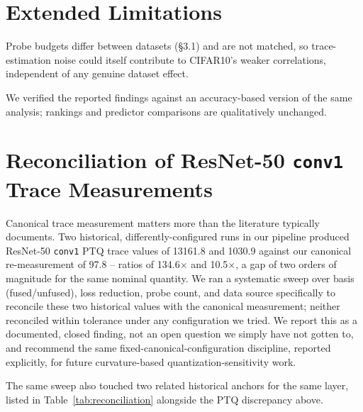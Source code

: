 \documentclass{article}
\begin{document}



\appendix

\section{Extended Limitations}
\label{app:limitations}
Probe budgets differ between datasets (\S3.1) and are not matched, so trace-estimation noise could itself contribute to CIFAR10's weaker correlations, independent of any genuine dataset effect.

We verified the reported findings against an accuracy-based version of the same analysis; rankings and predictor comparisons are qualitatively unchanged.

\section{Reconciliation of ResNet-50 \texttt{conv1} Trace Measurements}
\label{app:reconciliation}
Canonical trace measurement matters more than the literature typically documents. Two historical, differently-configured runs in our pipeline produced ResNet-50 \texttt{conv1} PTQ trace values of 13161.8 and 1030.9 against our canonical re-measurement of 97.8 -- ratios of 134.6$\times$ and 10.5$\times$, a gap of two orders of magnitude for the same nominal quantity. We ran a systematic sweep over basis (fused/unfused), loss reduction, probe count, and data source specifically to reconcile these two historical values with the canonical measurement; neither reconciled within tolerance under any configuration we tried. We report this as a documented, closed finding, not an open question we simply have not gotten to, and recommend the same fixed-canonical-configuration discipline, reported explicitly, for future curvature-based quantization-sensitivity work.

The same sweep also touched two related historical anchors for the same layer, listed in Table~\ref{tab:reconciliation} alongside the PTQ discrepancy above.
\end{document}
